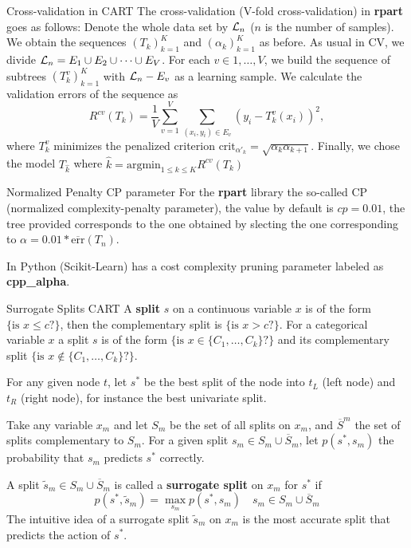 \documentclass{beamer}
\begin{document}
\begin{frame}{Cross-validation in CART}
	The cross-validation (V-fold cross-validation) in \textbf{rpart} goes as follows:
	Denote the whole data set by ${\cal L}_n$ ($n$ is the number of samples). We obtain the sequences $(T_k)_{k=1}^K$ and $(\alpha_k)_{k =1}^K$ as before.  
	As usual in CV, we divide ${\cal L}_n= E_1 \cup E_2 \cup \cdots \cup E_V$. For each $v \in 1,\ldots, V$, we build the sequence of subtrees $(T_k^v)_{k=1}^K$ with ${\cal L}_n - E_v$ as a learning sample. We calculate the validation errors of the sequence as
	\begin{equation*}
		R^{cv}(T_k)= \frac{1}{V} \sum_{v=1}^V \sum_{(x_i,y_i)\in E_v} (y_i - T_k^v(x_i))^2,
	\end{equation*}
	where $T_k^v$ minimizes the penalized criterion $\text{crit}_{\alpha'_k}= \sqrt{\alpha_k \alpha_{k+1}}$. 
	Finally, we chose the model $T_{\hat{k}}$ where $\hat{k}= \text{argmin}_{1\le k \le K}R^{cv}(T_k)$
\end{frame}

\begin{frame}{Normalized Penalty CP parameter}
	For the \textbf{rpart} library the so-called CP (normalized complexity-penalty parameter), the value by default is $cp=0.01$, the tree provided corresponds to the one obtained by slecting the one corresponding to $\alpha=0.01* \overline{\text{err}}(T_n)$.
	
	In Python (Scikit-Learn) has a cost complexity pruning parameter labeled as \textbf{cpp\_alpha}.
\end{frame}

\begin{frame}{Surrogate Splits CART}
	A \textbf{split} $s$ on a continuous variable $x$ is of the form $\{ \textrm{is }x \le c ?\}$, then the complementary split is $\{ \textrm{is }x > c ?\}$. For a categorical variable $x$ a split $s$ is of the form $\{ \textrm{is }x \in \{C_1,\ldots, C_k\}?\}$ and its complementary split $\{ \textrm{is }x \notin \{C_1,\ldots, C_k\}?\}$.
	
	For any given node $t$, let $s^*$ be the best split of the node into $t_L$ (left node) and $t_R$ (right node), for instance the best univariate split.
	
	Take any variable $x_m$ and let $S_m$ be the set of all splits on $x_m$, and $\overline{S}^m$ the set of splits complementary to $S_m$.  For a given split $s_m\in S_m \cup \overline{S}_m$, let  $p(s^*,s_m)$ the probability that $s_m$ predicts $s^*$ correctly.
	
	A split $\tilde{s}_m   \in S_m \cup \overline{S}_m$ is called a \textbf{surrogate split} on $x_m$ for $s^*$ if 
	\begin{equation*}
		p(s^*,\tilde{s}_m)= \max_{s_m} p(s^*,s_m) \quad s_m \in S_m \cup \overline{S}_m
	\end{equation*}
	The intuitive idea of a surrogate split $\tilde{s}_m$ on $x_m$ is the most accurate split that predicts the action of $s^*$. 
\end{frame}
\end{document}
